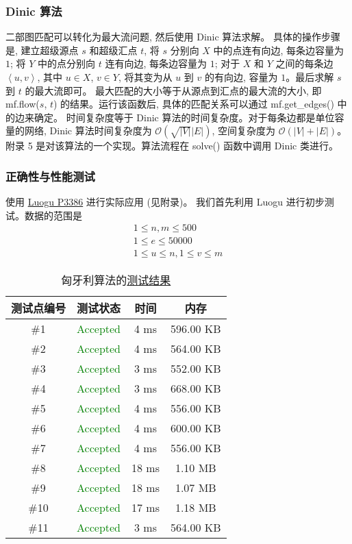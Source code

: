 \subsubsection{Dinic 算法}
二部图匹配可以转化为最大流问题, 然后使用 Dinic 算法求解。
具体的操作步骤是, 建立超级源点 $s$ 和超级汇点 $t$, 将 $s$ 分别向 $X$ 中的点连有向边, 每条边容量为 $1$; 将 $Y$ 中的点分别向 $t$ 连有向边, 每条边容量为 $1$; 对于 $X$ 和 $Y$ 之间的每条边 $\left<u, v\right>$, 其中 $u \in X$, $v \in Y$, 将其变为从 $u$ 到 $v$ 的有向边, 容量为 $1$。最后求解 $s$ 到 $t$ 的最大流即可。
最大匹配的大小等于从源点到汇点的最大流的大小, 即 mf.flow($s$, $t$) 的结果。运行该函数后, 具体的匹配关系可以通过 mf.get\_edges() 中的边来确定。
时间复杂度等于 Dinic 算法的时间复杂度。对于每条边都是单位容量的网络, Dinic 算法时间复杂度为 $\mathcal{O}(\sqrt{\left|V\right|}\left|E\right|)$, 空间复杂度为 $\mathcal{O}(\left|V\right| + \left|E\right|)$。
附录 5 是对该算法的一个实现。算法流程在 solve() 函数中调用 Dinic 类进行。
\subsubsection{正确性与性能测试}
使用 \href{https://www.luogu.com.cn/problem/P3386}{Luogu P3386} 进行实际应用 (见附录)。
我们首先利用 Luogu 进行初步测试。数据的范围是
$$
\begin{gathered}
	1 \leq n, m \leq 500 \\
	1 \leq e \leq 50000 \\
	1 \leq u \leq n, 1 \leq v \leq m
\end{gathered}
$$

\begin{table}[H]
	\centering
	\caption{匈牙利算法的\href{https://www.luogu.com.cn/record/195131973}{测试结果}}
	\label{tab:kuhn_test_results}
	\linewidth
	\begin{tabular*}{0.99\linewidth}{cccc}
		\toprule
		\textbf{测试点编号} & \textbf{测试状态} & \textbf{时间} & \textbf{内存} \\
		\midrule
		\#1 & \textcolor{green}{Accepted} & 4 ms & 596.00 KB \\
		\#2 & \textcolor{green}{Accepted} & 4 ms & 564.00 KB \\
		\#3 & \textcolor{green}{Accepted} & 3 ms & 552.00 KB \\
		\#4 & \textcolor{green}{Accepted} & 3 ms & 668.00 KB \\
		\#5 & \textcolor{green}{Accepted} & 4 ms & 556.00 KB \\
		\#6 & \textcolor{green}{Accepted} & 4 ms & 600.00 KB \\
		\#7 & \textcolor{green}{Accepted} & 4 ms & 556.00 KB \\
		\#8 & \textcolor{green}{Accepted} & 18 ms & 1.10 MB \\
		\#9 & \textcolor{green}{Accepted} & 18 ms & 1.07 MB \\
		\#10 & \textcolor{green}{Accepted} & 17 ms & 1.18 MB \\
		\#11 & \textcolor{green}{Accepted} & 3 ms & 564.00 KB \\
		\bottomrule
	\end{tabular*}
\end{table}

